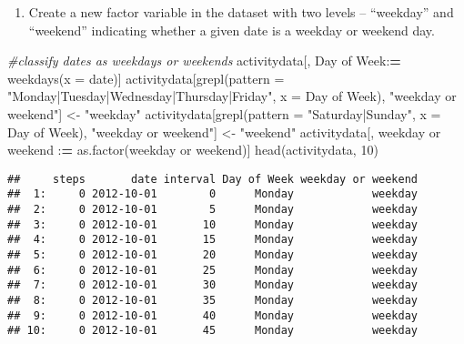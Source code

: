 \documentclass[
]{article}
\newenvironment{Shaded}{\begin{snugshade}}{\end{snugshade}}
\newcommand{\AttributeTok}[1]{\textcolor[rgb]{0.77,0.63,0.00}{#1}}
\newcommand{\CommentTok}[1]{\textcolor[rgb]{0.56,0.35,0.01}{\textit{#1}}}
\newcommand{\DecValTok}[1]{\textcolor[rgb]{0.00,0.00,0.81}{#1}}
\newcommand{\ErrorTok}[1]{\textcolor[rgb]{0.64,0.00,0.00}{\textbf{#1}}}
\newcommand{\FunctionTok}[1]{\textcolor[rgb]{0.00,0.00,0.00}{#1}}
\newcommand{\NormalTok}[1]{#1}
\newcommand{\OtherTok}[1]{\textcolor[rgb]{0.56,0.35,0.01}{#1}}
\newcommand{\SpecialCharTok}[1]{\textcolor[rgb]{0.00,0.00,0.00}{#1}}
\newcommand{\StringTok}[1]{\textcolor[rgb]{0.31,0.60,0.02}{#1}}
\providecommand{\tightlist}{%
  \setlength{\itemsep}{0pt}\setlength{\parskip}{0pt}}
\begin{document}
\begin{enumerate}
\def\labelenumi{\arabic{enumi}.}
\tightlist
\item
  Create a new factor variable in the dataset with two levels --
  ``weekday'' and ``weekend'' indicating whether a given date is a
  weekday or weekend day.
\end{enumerate}

\begin{Shaded}
\begin{Highlighting}[]
\CommentTok{\#classify dates as weekdays or weekends}
\NormalTok{activitydata[, }\StringTok{\textasciigrave{}}\AttributeTok{Day of Week}\StringTok{\textasciigrave{}}\SpecialCharTok{:}\ErrorTok{=} \FunctionTok{weekdays}\NormalTok{(}\AttributeTok{x =}\NormalTok{ date)]}
\NormalTok{activitydata[}\FunctionTok{grepl}\NormalTok{(}\AttributeTok{pattern =} \StringTok{"Monday|Tuesday|Wednesday|Thursday|Friday"}\NormalTok{, }\AttributeTok{x =} \StringTok{\textasciigrave{}}\AttributeTok{Day of Week}\StringTok{\textasciigrave{}}\NormalTok{), }\StringTok{"weekday or weekend"}\NormalTok{] }\OtherTok{\textless{}{-}} \StringTok{"weekday"}
\NormalTok{activitydata[}\FunctionTok{grepl}\NormalTok{(}\AttributeTok{pattern =} \StringTok{"Saturday|Sunday"}\NormalTok{, }\AttributeTok{x =} \StringTok{\textasciigrave{}}\AttributeTok{Day of Week}\StringTok{\textasciigrave{}}\NormalTok{), }\StringTok{"weekday or weekend"}\NormalTok{] }\OtherTok{\textless{}{-}} \StringTok{"weekend"}
\NormalTok{activitydata[, }\StringTok{\textasciigrave{}}\AttributeTok{weekday or weekend}\StringTok{\textasciigrave{}} \SpecialCharTok{:}\ErrorTok{=} \FunctionTok{as.factor}\NormalTok{(}\StringTok{\textasciigrave{}}\AttributeTok{weekday or weekend}\StringTok{\textasciigrave{}}\NormalTok{)]}
\FunctionTok{head}\NormalTok{(activitydata, }\DecValTok{10}\NormalTok{)}
\end{Highlighting}
\end{Shaded}

\begin{verbatim}
##     steps       date interval Day of Week weekday or weekend
##  1:     0 2012-10-01        0      Monday            weekday
##  2:     0 2012-10-01        5      Monday            weekday
##  3:     0 2012-10-01       10      Monday            weekday
##  4:     0 2012-10-01       15      Monday            weekday
##  5:     0 2012-10-01       20      Monday            weekday
##  6:     0 2012-10-01       25      Monday            weekday
##  7:     0 2012-10-01       30      Monday            weekday
##  8:     0 2012-10-01       35      Monday            weekday
##  9:     0 2012-10-01       40      Monday            weekday
## 10:     0 2012-10-01       45      Monday            weekday
\end{verbatim}
\end{document}
